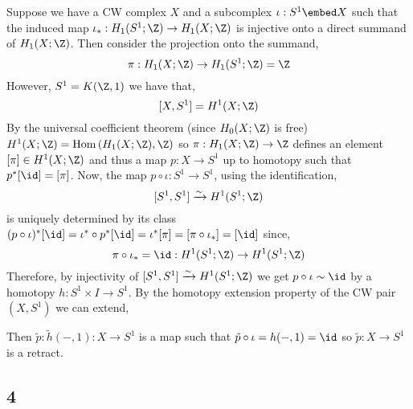 \documentclass[12pt]{extarticle}
\begin{document}
Suppose we have a CW complex $X$ and a subcomplex $\iota : S^1 \embed X$ such that the induced map $\iota_* : H_1(S^1; \Z) \to H_1(X;\Z)$ is injective onto a direct summand of $H_1(X; \Z)$. Then consider the projection onto the summand,
\[ \pi : H_1(X; \Z) \to H_1(S^1; \Z) = \Z \]
However, $S^1 = K(\Z, 1)$ we have that,
\[ [X, S^1] = H^1(X; \Z) \]
By the universal coefficient theorem (since $H_0(X;\Z)$ is free) $H^1(X;\Z) = \Hom{H_1(X;\Z)}{\Z}$ so $\pi : H_1(X; \Z) \to \Z$ defines an element $[\pi] \in H^1(X; \Z)$ and thus a map $p : X \to S^1$ up to homotopy such that $p^* [\id] = [\pi]$. Now, the map $p \circ \iota : S^1 \to S^1$, using the identification,
\[ [S^1, S^1] \xrightarrow{\sim}  H^1(S^1; \Z) \]
is uniquely determined by its class $(p \circ \iota)^* [\id] = \iota^* \circ p^* [\id] = \iota^* [\pi] = [\pi \circ \iota_*] = [\id]$ since,
\[ \pi \circ \iota_* = \id : H^1(S^1; \Z) \to H^1(S^1; \Z) \]
Therefore, by injectivity of $[S^1, S^1] \xrightarrow{\sim} H^1(S^1; \Z)$ we get $p \circ \iota \sim \id$ by a homotopy $h : S^1 \times I \to S^1$. By the homotopy extension property of the CW pair $(X, S^1)$ we can extend,
\begin{center}
\end{center}  
Then $\tilde{p} : \tilde{h}(-, 1) : X \to S^1$ is a map such that $\tilde{p} \circ \iota = h(-,1) = \id$ so $\tilde{p} : X \to S^1$ is a retract. 

\subsection{4}
\end{document}
